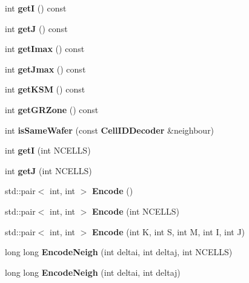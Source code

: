 \begin{DoxyCompactItemize}
\item 
int {\bfseries get\-I} () const \label{classCellIDDecoder_a7178a0e8fca513f2c63b072a7d1ef031}

\item 
int {\bfseries get\-J} () const \label{classCellIDDecoder_aa2ccda21c1eda20d8cfb49d5b095e7bb}

\item 
int {\bfseries get\-Imax} () const \label{classCellIDDecoder_ac7f29623ab8a976a2e1a3a433a386da4}

\item 
int {\bfseries get\-Jmax} () const \label{classCellIDDecoder_a75a5dadf8c8a13099078e5cc5878f763}

\item 
int {\bfseries get\-K\-S\-M} () const \label{classCellIDDecoder_a10b875d5861db0e62b01fa5d78691e82}

\item 
int {\bfseries get\-G\-R\-Zone} () const \label{classCellIDDecoder_a58d5ee7717684a20890d7cdca28b1861}

\item 
int {\bfseries is\-Same\-Wafer} (const {\bf Cell\-I\-D\-Decoder} \&neighbour)\label{classCellIDDecoder_a4297eb41dc656f43e003e71a15ca872d}

\item 
int {\bfseries get\-I} (int N\-C\-E\-L\-L\-S)\label{classCellIDDecoder_a0f1d29c476fc382f9c8d8ed66c5a9940}

\item 
int {\bfseries get\-J} (int N\-C\-E\-L\-L\-S)\label{classCellIDDecoder_ac49dea91b9e9b89aa017c57d554b6abd}

\item 
std\-::pair$<$ int, int $>$ {\bfseries Encode} ()\label{classCellIDDecoder_a6b686fd95782c17d6ac3b5e23ff78973}

\item 
std\-::pair$<$ int, int $>$ {\bfseries Encode} (int N\-C\-E\-L\-L\-S)\label{classCellIDDecoder_a985d59486ee5905edb133bc913e3b6cf}

\item 
std\-::pair$<$ int, int $>$ {\bfseries Encode} (int K, int S, int M, int I, int J)\label{classCellIDDecoder_a798ce6ff231fc70e904cd20d23a37210}

\item 
long long {\bfseries Encode\-Neigh} (int deltai, int deltaj, int N\-C\-E\-L\-L\-S)\label{classCellIDDecoder_a01a1621bdb246bbf8100d34e0ab2983e}

\item 
long long {\bfseries Encode\-Neigh} (int deltai, int deltaj)\label{classCellIDDecoder_adbeab7f1741e44595dd06616fdca8a1f}

\end{DoxyCompactItemize}
